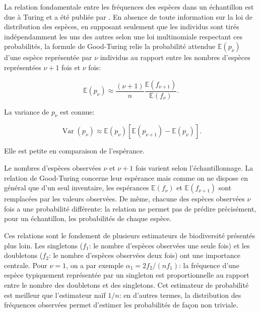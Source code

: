 \documentclass[
  11pt,
  american,
  a4paper,
  extrafontsizes,onecolumn,openright
  ]{memoir}
\begin{document}
La relation fondamentale entre les fréquences des espèces dans un échantillon est due à Turing et a été publiée par \textcite{Good1953}.
En absence de toute information sur la loi de distribution des espèces, en supposant seulement que les individus sont tirés indépendamment les uns des autres selon une loi multinomiale respectant ces probabilités, la formule de Good-Turing relie la probabilité attendue \({\mathbb E}(p_\nu)\) d'une espèce représentée par \(\nu\) individus au rapport entre les nombres d'espèces représentées \(\nu+1\) fois et \(\nu\) fois:

\begin{equation}
  \label{eq:alphanu}
  {\mathbb E}\left( p_\nu \right) 
  \approx \frac{(\nu + 1)}{n} \frac{{\mathbb E}\left( f_{\nu+1} \right)}{{\mathbb E}\left( f_\nu \right)}.
\end{equation}

La variance de \(p_\nu\) est connue:

\begin{equation}
  \label{eq:varpnu}
  \operatorname{Var}\left( p_\nu \right) 
  \approx {\mathbb E}\left( p_\nu \right) \left[ {\mathbb E}\left( p_{\nu + 1} \right) - {\mathbb E}\left( p_\nu \right) \right].
\end{equation}

Elle est petite en comparaison de l'espérance.

Le nombres d'espèces observées \(\nu\) et \(\nu + 1\) fois varient selon l'échantillonnage.
La relation de Good-Turing concerne leur espérance mais comme on ne dispose en général que d'un seul inventaire, les espérances \({\mathbb E}(f_\nu)\) et \({\mathbb E}(f_{\nu + 1})\) sont remplacées par les valeurs observées.
De même, chacune des espèces observées \(\nu\) fois a une probabilité différente: la relation ne permet pas de prédire précisément, pour un échantillon, les probabilités de chaque espèce.

Ces relations sont le fondement de plusieurs estimateurs de biodiversité présentés plus loin.
Les singletons (\(f_{1}\): le nombre d'espèces observées une seule fois) et les doubletons (\(f_{2}\): le nombre d'espèces observées deux fois) ont une importance centrale.
Pour \(\nu=1\), on a par exemple \(\alpha_1 = 2 f_{2}/(nf_{1})\): la fréquence d'une espèce typiquement représentée par un singleton est proportionnelle au rapport entre le nombre des doubletons et des singletons.
Cet estimateur de probabilité est meilleur que l'estimateur naïf \(1/n\): en d'autres termes, la distribution des fréquences observées permet d'estimer les probabilités de façon non triviale.
\end{document}
